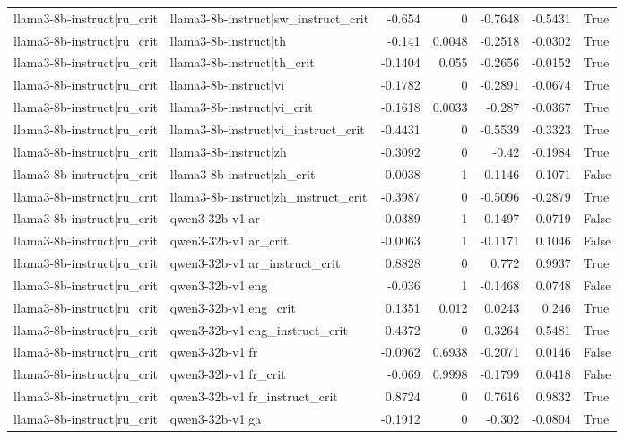 \begin{table}
\begin{tabular}{l l r r r r l}
llama3-8b-instruct|ru_crit & llama3-8b-instruct|sw_instruct_crit & -0.654 & 0 & -0.7648 & -0.5431 & True \\
llama3-8b-instruct|ru_crit & llama3-8b-instruct|th & -0.141 & 0.0048 & -0.2518 & -0.0302 & True \\
llama3-8b-instruct|ru_crit & llama3-8b-instruct|th_crit & -0.1404 & 0.055 & -0.2656 & -0.0152 & True \\
llama3-8b-instruct|ru_crit & llama3-8b-instruct|vi & -0.1782 & 0 & -0.2891 & -0.0674 & True \\
llama3-8b-instruct|ru_crit & llama3-8b-instruct|vi_crit & -0.1618 & 0.0033 & -0.287 & -0.0367 & True \\
llama3-8b-instruct|ru_crit & llama3-8b-instruct|vi_instruct_crit & -0.4431 & 0 & -0.5539 & -0.3323 & True \\
llama3-8b-instruct|ru_crit & llama3-8b-instruct|zh & -0.3092 & 0 & -0.42 & -0.1984 & True \\
llama3-8b-instruct|ru_crit & llama3-8b-instruct|zh_crit & -0.0038 & 1 & -0.1146 & 0.1071 & False \\
llama3-8b-instruct|ru_crit & llama3-8b-instruct|zh_instruct_crit & -0.3987 & 0 & -0.5096 & -0.2879 & True \\
llama3-8b-instruct|ru_crit & qwen3-32b-v1|ar & -0.0389 & 1 & -0.1497 & 0.0719 & False \\
llama3-8b-instruct|ru_crit & qwen3-32b-v1|ar_crit & -0.0063 & 1 & -0.1171 & 0.1046 & False \\
llama3-8b-instruct|ru_crit & qwen3-32b-v1|ar_instruct_crit & 0.8828 & 0 & 0.772 & 0.9937 & True \\
llama3-8b-instruct|ru_crit & qwen3-32b-v1|eng & -0.036 & 1 & -0.1468 & 0.0748 & False \\
llama3-8b-instruct|ru_crit & qwen3-32b-v1|eng_crit & 0.1351 & 0.012 & 0.0243 & 0.246 & True \\
llama3-8b-instruct|ru_crit & qwen3-32b-v1|eng_instruct_crit & 0.4372 & 0 & 0.3264 & 0.5481 & True \\
llama3-8b-instruct|ru_crit & qwen3-32b-v1|fr & -0.0962 & 0.6938 & -0.2071 & 0.0146 & False \\
llama3-8b-instruct|ru_crit & qwen3-32b-v1|fr_crit & -0.069 & 0.9998 & -0.1799 & 0.0418 & False \\
llama3-8b-instruct|ru_crit & qwen3-32b-v1|fr_instruct_crit & 0.8724 & 0 & 0.7616 & 0.9832 & True \\
llama3-8b-instruct|ru_crit & qwen3-32b-v1|ga & -0.1912 & 0 & -0.302 & -0.0804 & True \\

\end{tabular}
\end{table}
